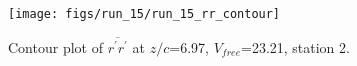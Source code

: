 \begin{figure}[H]
\centering
\texttt{[image: figs/run\_15/run\_15\_rr\_contour]}
\caption{Contour plot of $\overline{r^\prime r^\prime}$ at $z/c$=6.97, $V_{free}$=23.21, station 2.}
\label{fig:run_15_rr_contour}
\end{figure}


